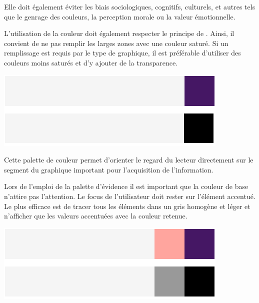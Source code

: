 \documentclass[a4paper,12pt]{article}
\begin{document}
\begin{multicols}{2}
Elle doit également éviter les biais sociologiques, cognitifs, culturels, et autres tels que le genrage des couleurs,\autocite{andreaskrauseBestPracticesData2024} la perception morale\autocite{rose-greenlandColorPerceptionSociology2016} ou la valeur émotionnelle.\autocite{tranDiscoveringAccessibleData2024}

L'utilisation de la couleur doit également respecter le principe de \autocite[sur l'encre de Tufte]{principe}. Ainsi, il convient de ne pas remplir les larges zones avec une couleur saturé.\autocite{wilkeCommonPitfallsColor2019} Si un remplissage est requis par le type de graphique, il est préférable d'utiliser des couleurs moins saturés et d'y ajouter de la transparence. \autocite{ref?}

\begin{center}
\includegraphics[width=.9\linewidth]{./img/palette-evidence.pdf}
\end{center}

Cette palette de couleur permet d'orienter le regard du lecteur directement sur le segment du graphique important pour l'acquisition de l'information.\autocite{andreaskrauseBestPracticesData2024}

Lors de l'emploi de la palette d'évidence il est important que la couleur de base n'attire pas l'attention. Le focus de l'utilisateur doit rester sur l'élément accentué.\autocite{wilkeColorScales2019}
Le plus efficace est de tracer tous les éléments dans un gris homogène et léger et n'afficher que les valeurs accentuées avec la couleur retenue. \autocite{wilkeColorScales2019}

\begin{center}
\includegraphics[width=.9\linewidth]{./img/palette-binaire.pdf}
\end{center}


\end{multicols}
\end{document}
